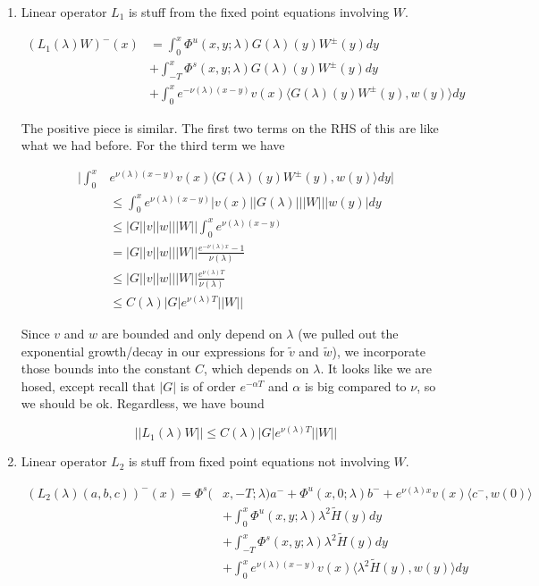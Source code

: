 \documentclass[12pt]{article}
\begin{document}
\begin{enumerate}

\item Linear operator $L_1$ is stuff from the fixed point equations involving $W$.

\begin{align*}
(L_1(\lambda)W)^-(x) &= \int_0^x \Phi^u(x, y; \lambda) G(\lambda)(y)W^\pm(y) dy \\
&+ \int_{-T}^x \Phi^s(x, y; \lambda) G(\lambda)(y)W^\pm(y) dy \\
&+ \int_0^x 
e^{-\nu(\lambda)(x-y)} v(x) \langle G(\lambda)(y)W^\pm(y), w(y) \rangle dy 
\end{align*}

The positive piece is similar. The first two terms on the RHS of this are like what we had before. For the third term we have

\begin{align*}
\Big| \int_0^x &e^{\nu(\lambda)(x-y)} v(x) \langle G(\lambda)(y)W^\pm(y), w(y) \rangle dy \Big| \\
&\leq \int_0^x e^{\nu(\lambda)(x-y)} |v(x)| |G(\lambda)|||W|||w(y)|dy \\
&\leq |G||v||w|||W|| \int_0^x e^{\nu(\lambda)(x-y)} \\
&= |G||v||w|||W|| \frac{e^{-\nu(\lambda)x} - 1}{\nu(\lambda)} \\
&\leq |G||v||w|||W|| \frac{e^{\nu(\lambda)T}}{\nu(\lambda)} \\
&\leq C(\lambda) |G| e^{\nu(\lambda)T} ||W||
\end{align*}

Since $v$ and $w$ are bounded and only depend on $\lambda$ (we pulled out the exponential growth/decay in our expressions for $\tilde{v}$ and $\tilde{w}$), we incorporate those bounds into the constant $C$, which depends on $\lambda$. It looks like we are hosed, except recall that $|G|$ is of order $e^{-\alpha T}$ and $\alpha$ is big compared to $\nu$, so we should be ok. Regardless, we have bound

\[
||L_1(\lambda)W|| \leq C(\lambda) |G| e^{\nu(\lambda)T} ||W||
\]

\item Linear operator $L_2$ is stuff from fixed point equations not involving $W$.


\begin{align*}
(L_2(\lambda)(a,b,c))^-(x) = \Phi^s(&x, -T; \lambda)a^- + \Phi^u(x, 0; \lambda)b^- + e^{\nu(\lambda)x} v(x) \langle c^-, w(0) \rangle  \\
&+ \int_0^x \Phi^u(x, y; \lambda) \lambda^2 \tilde{H}(y) dy \\
&+ \int_{-T}^x \Phi^s(x, y; \lambda) \lambda^2 \tilde{H}(y) dy \\
&+ \int_0^x 
e^{\nu(\lambda)(x-y)} v(x) \langle \lambda^2 \tilde{H}(y), w(y) \rangle dy
\end{align*}


\end{enumerate}
\end{document}
